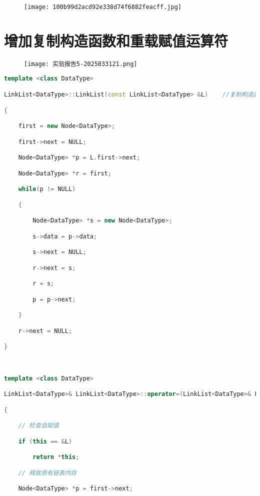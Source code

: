 \begin{figure}[H]
\centering
\texttt{[image: 100b99d2acd92e338d74f6882feacff.jpg]}
\label{}
\end{figure}

\section{增加复制构造函数和重载赋值运算符}

\begin{figure}[H]
\centering
\texttt{[image: 实验报告5-2025033121.png]}
\label{}
\end{figure}

\begin{lstlisting}[language=C++]
template <class DataType>

LinkList<DataType>::LinkList(const LinkList<DataType> &L)    //复制构造函数,带头节点

{

    first = new Node<DataType>;

    first->next = NULL;

    Node<DataType> *p = L.first->next;

    Node<DataType> *r = first;

    while(p != NULL)

    {

        Node<DataType> *s = new Node<DataType>;

        s->data = p->data;

        s->next = NULL;

        r->next = s;

        r = s;

        p = p->next;

    }

    r->next = NULL;

}

  

template <class DataType>

LinkList<DataType>& LinkList<DataType>::operator=(LinkList<DataType>& L)    //重载赋值函数，实现A=B赋值

{

    // 检查自赋值

    if (this == &L)

        return *this;

    // 释放原有链表内存

    Node<DataType> *p = first->next;


\end{lstlisting}
